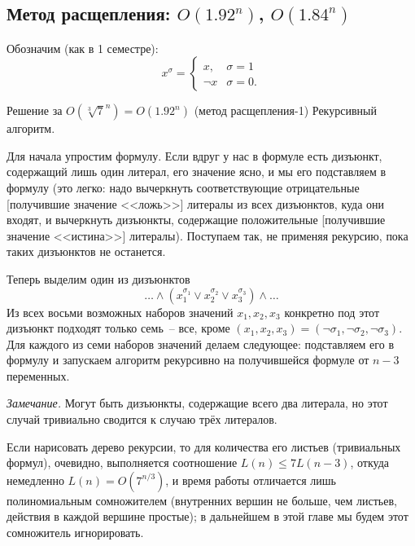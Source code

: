 \subsection{Метод расщепления: $O(1.92^n)$, $O(1.84^n)$}
Обозначим (как в 1 семестре): $$x^\sigma = 
\begin{cases}
x, & \sigma = 1 \\
\neg x & \sigma = 0.
\end{cases}$$
\begin{algodescription}{Решение за $O\left(\sqrt[3]{7}^n\right) = O(1.92^n)$ (метод расщепления-1)}
    Рекурсивный алгоритм. 

    Для начала упростим формулу. Если вдруг у нас в формуле есть дизъюнкт, содержащий лишь один литерал, его значение ясно, и мы его подставляем в формулу
    (это легко: надо вычеркнуть соответствующие отрицательные [получившие значение <<ложь>>] литералы из всех дизъюнктов, куда они входят, 
    и вычеркнуть дизъюнкты, содержащие положительные [получившие значение <<истина>>] литералы).
    Поступаем так, не применяя рекурсию, пока таких дизъюнктов не останется.

    Теперь выделим один из дизъюнктов $$\ldots\land(x_1^{\sigma_1} \lor x_2^{\sigma_2} \lor x_3^{\sigma_3})\land\ldots$$ Из всех восьми возможных наборов значений $x_1, x_2, x_3$ конкретно под этот дизъюнкт подходят только семь~-- все, кроме $(x_1, x_2, x_3) = (\neg\sigma_1, \neg\sigma_2, \neg\sigma_3)$.
    Для каждого из семи наборов значений делаем следующее: подставляем его в формулу и запускаем алгоритм рекурсивно на получившейся формуле от $n-3$ переменных. 
    
    \emph{Замечание.} Могут быть дизъюнкты, содержащие всего два литерала, но этот случай тривиально сводится к случаю трёх литералов.
    
    Если нарисовать дерево рекурсии, то для количества его листьев (тривиальных формул), очевидно, выполняется соотношение 
    $L(n) \le 7L(n-3)$, откуда немедленно $L(n) = O(7^{n/3})$, 
    и время работы отличается лишь полиномиальным сомножителем 
    (внутренних вершин не больше, чем листьев, действия в каждой вершине простые);
    в дальнейшем в этой главе мы будем этот сомножитель игнорировать.
\end{algodescription}

